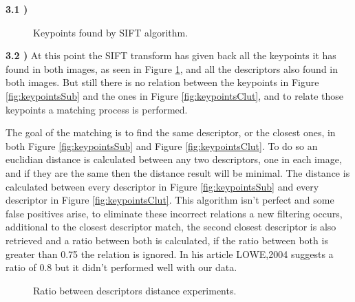 \documentclass[12pt,a4paper]{article}
\begin{document}
\textbf{3.1 )}

\begin{figure}[!h]
	\centering
	\quad
	\caption{Keypoints found by SIFT algorithm.}
	\label{fig:keypoints}
\end{figure}

\textbf{3.2 )} At this point the SIFT transform has given back all the keypoints it has found in both images, as seen in Figure \ref{fig:keypoints}, and all the descriptors also found in both images. But still there is no relation between the keypoints in Figure \ref{fig:keypointsSub} and the ones in Figure \ref{fig:keypointsClut}, and to relate those keypoints a matching process is performed.
\par
	The goal of the matching is to find the same descriptor, or the closest ones, in both Figure \ref{fig:keypointsSub} and Figure \ref{fig:keypointsClut}. To do so an euclidian distance is calculated between any two descriptors, one in each image, and if they are the same then the distance result will be minimal. The distance is calculated between every descriptor in Figure \ref{fig:keypointsSub} and every descriptor in Figure \ref{fig:keypointsClut}. This algorithm isn't perfect and some false positives arise, to eliminate these incorrect relations a new filtering occurs, additional to the closest descriptor match, the second closest descriptor is also retrieved and a ratio between both is calculated, if the ratio between both is greater than 0.75 the relation is ignored. In his article LOWE,2004 suggests a ratio of 0.8 but it didn't performed well with our data.

\begin{figure}[!h]
	\centering
	\quad
	\caption{Ratio between descriptors distance experiments.}
	\label{fig:matchRatio}
\end{figure}
\end{document}
